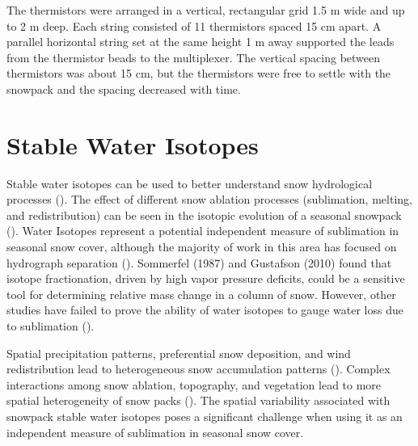 The thermistors were arranged in a vertical, rectangular grid 1.5 m wide and up to 2 m deep. Each string consisted of 11 thermistors spaced 15 cm apart. A parallel horizontal string set at the same height 1 m away supported the leads from the thermistor beads to the multiplexer. The vertical spacing between thermistors was about 15 cm, but the thermistors were free to settle with the snowpack and the spacing decreased with time. 

\subsection{\cite{Black_Luce}}


\section{Stable Water Isotopes} 
Stable water isotopes can be used to better understand snow hydrological processes (\cite{beria_larsen_ceperley_michelon_vennemann_schaefli_2017}). The effect of different snow ablation processes (sublimation, melting, and redistribution) can be seen in the isotopic evolution of a seasonal snowpack (\cite{beria_larsen_ceperley_michelon_vennemann_schaefli_2017}). Water Isotopes represent a potential independent measure of sublimation in seasonal snow cover, although the majority of work in this area has focused on hydrograph separation (\cite{gustafson2010estimating}). Sommerfel (1987) and Gustafson (2010) found that isotope fractionation, driven by high vapor pressure deficits, could be a sensitive tool for determining relative mass change in a column of snow. However, other studies have failed to prove the ability of water isotopes to gauge water loss due to sublimation (\cite{friedman1991isotopic}). 

Spatial precipitation patterns, preferential snow deposition, and wind redistribution lead to heterogeneous snow accumulation patterns (\cite{beria_larsen_ceperley_michelon_vennemann_schaefli_2017}). Complex interactions among snow ablation, topography, and vegetation lead to more spatial heterogeneity of snow packs (\cite{beria_larsen_ceperley_michelon_vennemann_schaefli_2017}). The spatial variability associated with snowpack stable water isotopes poses a significant challenge when using it as an independent measure of sublimation in seasonal snow cover. 